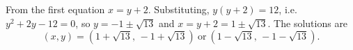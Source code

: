 From the first equation $x=y+2$. Substituting, $y(y+2)=12$, i.e. $y^2+2y-12=0$, so $y=-1\pm\sqrt{13}$ and $x=y+2=1\pm\sqrt{13}$. The solutions are
\[
\boxed{(x,y)=\left(1+\sqrt{13},\,-1+\sqrt{13}\right)\ \text{or}\ \left(1-\sqrt{13},\,-1-\sqrt{13}\right)}.
\]
